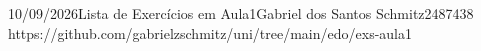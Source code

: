 \documentclass{article}
\begin{document}
{10/09/2026}{Lista de Exercícios em Aula}{1}{Gabriel dos Santos Schmitz}{2487438}
{https://github.com/gabrielzschmitz/uni/tree/main/edo/exs-aula1}




\newpage
\printbibliography\
\end{document}
